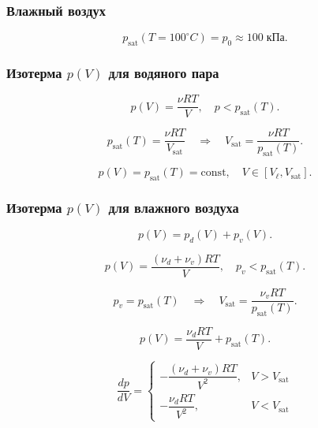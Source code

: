 \documentclass[12pt, a4paper]{article}
\begin{document}
\subsubsection*{Влажный воздух}

\[
p_\text{sat}(T = 100^\circ C) = p_0 \approx 100\; \text{кПа}.
\]

\subsubsection*{Изотерма \(p(V)\) для водяного пара}

\[
p(V)=\frac{\nu R T}{V}, \quad p < p_{\text{sat}}(T).
\]

\[
p_{\text{sat}}(T)=\frac{\nu R T}{V_{\text{sat}}} \quad \Longrightarrow \quad V_{\text{sat}}=\frac{\nu R T}{p_{\text{sat}}(T)}.
\]

\[
p(V)=p_{\text{sat}}(T)=\text{const}, \quad V \in [V_{\ell}, V_{\text{sat}}].
\]

\subsubsection*{Изотерма \(p(V)\) для влажного воздуха}

\[
p(V)=p_d(V)+p_v(V).
\]

\[
p(V)=\frac{(\nu_d+\nu_v) R T}{V}, \quad p_v < p_{\text{sat}}(T).
\]

\[
p_v = p_{\text{sat}}(T) \quad \Longrightarrow \quad V_{\text{sat}} = \frac{\nu_v R T}{p_{\text{sat}}(T)}.
\]

\[
p(V) = \frac{\nu_d R T}{V} + p_{\text{sat}}(T).
\]

\[
\frac{dp}{dV} =
\begin{cases}
-\dfrac{(\nu_d+\nu_v) R T}{V^2}, & V > V_{\text{sat}} \\
-\dfrac{\nu_d R T}{V^2}, & V < V_{\text{sat}}
\end{cases}
\]
\end{document}

